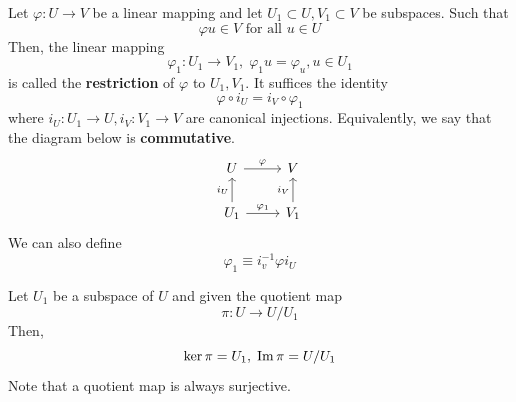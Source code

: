   \begin{definition}[Restriction]
    Let $\varphi: U \longrightarrow V$ be a linear mapping and let $U_1 \subset U, V_1 \subset V$ be subspaces. Such that 
    \begin{equation}
      \varphi u \in V \text{ for all } u \in U
    \end{equation}
    Then, the linear mapping 
    \begin{equation}
      \varphi_1: U_1 \longrightarrow V_1, \; \varphi_1 u = \varphi_u, u \in U_1
    \end{equation}
    is called the \textbf{restriction} of $\varphi$ to $U_1, V_1$. It suffices the identity
    \begin{equation}
      \varphi \circ i_U = i_V \circ \varphi_1
    \end{equation}
    where $i_U: U_1 \longrightarrow U, i_V: V_1 \longrightarrow V$ are canonical injections. Equivalently, we say that the diagram below is \textbf{commutative}. 
    \[
      \begin{tikzcd}
        U \arrow{r}{\varphi} & V \\
        U_1 \arrow{u}{i_U} \arrow{r}{\varphi_1} & V_1 \arrow{u}{i_V}
      \end{tikzcd}
    \]
    We can also define 
    \begin{equation}
      \varphi_1 \equiv i_v^{-1} \varphi i_U
    \end{equation}
  \end{definition}

  \begin{example}
    Let $U_1$ be a subspace of $U$ and given the quotient map
    \begin{equation}
      \pi: U \longrightarrow U / U_1
    \end{equation}
    Then, 
    \begin{equation}
      \text{ker}\,\pi = U_1, \; \operatorname{Im}{\pi} = U / U_1
    \end{equation}
    Note that a quotient map is always surjective. 
  \end{example}

